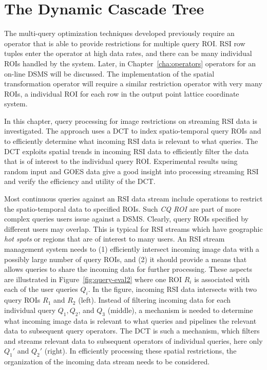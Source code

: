 \documentclass{ucdthesis}       %
\begin{document}
\chapter{The Dynamic Cascade Tree}
\label{cha:dct}

The multi-query optimization techniques developed previously require
an operator that is able to provide restrictions for multiple query
\ac{ROI}.  \ac{RSI} row tuples enter the operator at high data rates,
and there can be many individual \acp{ROI} handled by the system.
Later, in Chapter~\ref{cha:operators} operators for an on-line
\ac{DSMS} will be discussed.  The implementation of the spatial
transformation operator will require a similar restriction operator
with very many \acp{ROI}, a individual \ac{ROI} for each row in the
output point lattice coordinate system.  

In this chapter, query processing for image restrictions on streaming
\ac{RSI} data is investigated.  The approach uses a \acf{DCT} to index
spatio-temporal query \acp{ROI} and to efficiently determine what
incoming \ac{RSI} data is relevant to what queries.  The \ac{DCT}
exploits spatial trends in incoming \ac{RSI} data to efficiently
filter the data that is of interest to the individual query \ac{ROI}.
Experimental results using random input and \acf{GOES} data give a
good insight into processing streaming \ac{RSI} and verify the
efficiency and utility of the \ac{DCT}.

Most continuous queries against an \acs{RSI} data stream include
operations to restrict the spatio-temporal data to specified
\acp{ROI}.  Such \emph{\acf{CQ} \ac{ROI}} are part of more complex
queries users issue against a \acs{DSMS}.  Clearly, query \acp{ROI}
specified by different users may overlap.  This is typical for
\ac{RSI} streams which have geographic \emph{hot spots} or regions
that are of interest to many users.  An \acs{RSI} stream management
system needs to (1) efficiently intersect incoming image data with a
possibly large number of query \acp{ROI}, and (2) it should provide a
means that allows queries to share the incoming data for further
processing. These aspects are illustrated in
Figure~\ref{fig:query-eval2} where one \ac{ROI} $R_i$ is
associated with each of the user queries $Q_i$.  In the figure,
incoming \acs{RSI} data intersects with two query \acp{ROI} $R_1$ and
$R_2$ (left). Instead of filtering incoming data for each individual
query $Q_1, Q_2$, and $Q_3$ (middle), a mechanism is needed to
determine what incoming image data is relevant to what queries and
pipelines the relevant data to subsequent query operators.  The
\acs{DCT} is such a mechanism, which filters and streams relevant data
to subsequent operators of individual queries, here only $Q_1'$ and
$Q_2'$ (right).  In efficiently processing these spatial restrictions,
the organization of the incoming data stream needs to be considered.
\end{document}
